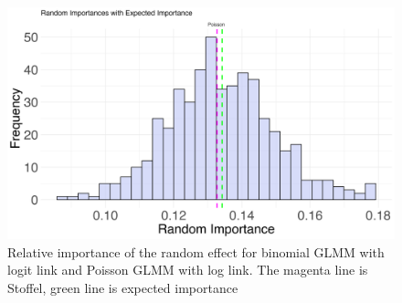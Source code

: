 
\begin{figure}[H]
  \centering
    \includegraphics[width=0.7\linewidth]{Figures/Simulation study/Random_poisson.png}
    \caption{Relative importance of the random effect for binomial GLMM with logit link and Poisson GLMM with log link. The magenta line is Stoffel, green line is expected importance}
    \label{fig:relimp_random_poisson}
\end{figure}

